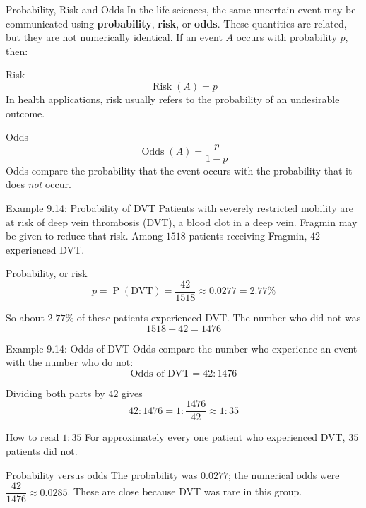 \documentclass[aspectratio=169]{beamer}
\newcommand{\prob}[1]{\operatorname{P}\!\left(#1\right)}
\begin{document}
\begin{frame}{Probability, Risk and Odds}
In the life sciences, the same uncertain event may be communicated using \textbf{probability}, \textbf{risk}, or \textbf{odds}. These quantities are related, but they are not numerically identical. If an event $A$ occurs with probability $p$, then:

\begin{block}{Risk}
$$\operatorname{Risk}(A)=p$$
In health applications, risk usually refers to the probability of an undesirable outcome.
\end{block}

\begin{block}{Odds}
$$\operatorname{Odds}(A)=\frac{p}{1-p}$$
Odds compare the probability that the event occurs with the probability that it does \emph{not} occur.
\end{block}
\end{frame}

\begin{frame}{Example 9.14: Probability of DVT}
Patients with severely restricted mobility are at risk of deep vein thrombosis (DVT), a blood clot in a deep vein. Fragmin may be given to reduce that risk. Among $1518$ patients receiving Fragmin, $42$experienced DVT.

\begin{block}{Probability, or risk}
$$p=\prob{\text{DVT}}=\frac{42}{1518}\approx 0.0277=2.77\%$$
\end{block}

So about $2.77\%$ of these patients experienced DVT. The number who did not was
$$1518-42=1476$$
\end{frame}

\begin{frame}{Example 9.14: Odds of DVT}
Odds compare the number who experience an event with the number who do not:
$$\text{Odds of DVT}=42:1476$$

Dividing both parts by $42$ gives
$$42:1476=1:\frac{1476}{42}\approx \boxed{1:35}$$

\small
\begin{block}{How to read $1:35$}
For approximately every one patient who experienced DVT, $35$ patients did not.
\end{block}

\begin{alertblock}{Probability versus odds}
The probability was $0.0277$; the numerical odds were $\dfrac{42}{1476}\approx 0.0285$. These are close because DVT was rare in this group.
\end{alertblock}
\end{frame}
\end{document}
